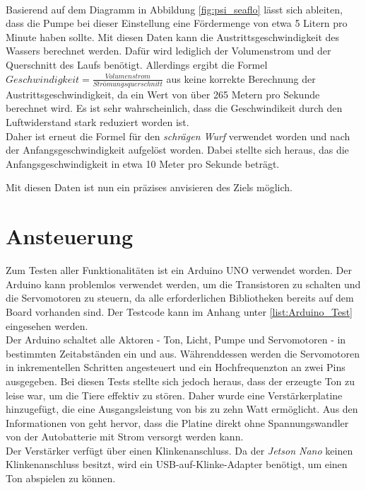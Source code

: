 \\
Basierend auf dem Diagramm in Abbildung \ref{fig:psi_seaflo} lässt sich ableiten, dass die Pumpe bei dieser Einstellung eine Fördermenge von etwa 5 Litern pro Minute haben sollte. Mit diesen Daten kann die Austrittsgeschwindigkeit des Wassers berechnet werden. Dafür wird lediglich der Volumenstrom und der Querschnitt des Laufs benötigt. Allerdings ergibt die Formel $Geschwindigkeit = \frac{Volumenstrom}{Strömungsquerschnitt}$ aus \cite{stroemungen} keine korrekte Berechnung der Austrittsgeschwindigkeit, da ein Wert von über 265 Metern pro Sekunde berechnet wird. Es ist sehr wahrscheinlich, dass die Geschwindikeit durch den Luftwiderstand stark reduziert worden ist.
\\
Daher ist erneut die Formel für den \textit{schrägen Wurf} verwendet worden und nach der Anfangsgeschwindigkeit aufgelöst worden. Dabei stellte sich heraus, das die Anfangsgeschwindigkeit in etwa 10 Meter pro Sekunde beträgt.

Mit diesen Daten ist nun ein präzises anvisieren des Ziels möglich.

\section{Ansteuerung}

Zum Testen aller Funktionalitäten ist ein Arduino UNO verwendet worden. Der Arduino kann problemlos verwendet werden, um die Transistoren zu schalten und die Servomotoren zu steuern, da alle erforderlichen Bibliotheken bereits auf dem Board vorhanden sind. Der Testcode kann im Anhang unter \ref{list:Arduino_Test} eingesehen werden.
\\
Der Arduino schaltet alle Aktoren - Ton, Licht, Pumpe und Servomotoren - in bestimmten Zeitabständen ein und aus. Währenddessen werden die Servomotoren in inkrementellen Schritten angesteuert und ein Hochfrequenzton an zwei Pins ausgegeben. Bei diesen Tests stellte sich jedoch heraus, dass der erzeugte Ton zu leise war, um die Tiere effektiv zu stören. Daher wurde eine Verstärkerplatine hinzugefügt, die eine Ausgangsleistung von bis zu zehn Watt ermöglicht. Aus den Informationen von \cite{am_sound_amp} geht hervor, dass die Platine direkt ohne Spannungswandler von der Autobatterie mit Strom versorgt werden kann.
\\
Der Verstärker verfügt über einen Klinkenanschluss. Da der \textit{Jetson Nano} keinen Klinkenanschluss besitzt, wird ein USB-auf-Klinke-Adapter benötigt, um einen Ton abspielen zu können.

